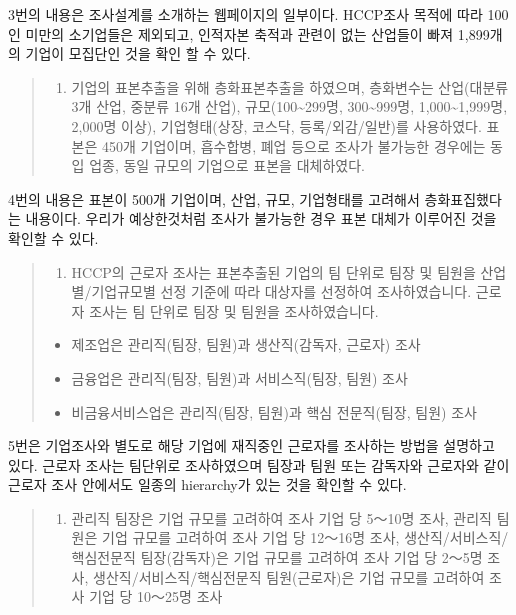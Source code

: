 \documentclass[
]{book}
\providecommand{\tightlist}{%
  \setlength{\itemsep}{0pt}\setlength{\parskip}{0pt}}
\theoremstyle{definition}
\theoremstyle{definition}
\theoremstyle{definition}
\theoremstyle{definition}
\theoremstyle{remark}
\begin{document}
3번의 내용은 조사설계를 소개하는 웹페이지의 일부이다. HCCP조사 목적에 따라 100인 미만의 소기업들은 제외되고, 인적자본 축적과 관련이 없는 산업들이 빠져 1,899개의 기업이 모집단인 것을 확인 할 수 있다.

\begin{quote}
\begin{enumerate}
\def\labelenumi{\arabic{enumi}.}
\setcounter{enumi}{3}
\tightlist
\item
  기업의 표본추출을 위해 층화표본추출을 하였으며, 층화변수는 산업(대분류 3개 산업, 중분류 16개 산업), 규모(100\textasciitilde299명, 300\textasciitilde999명, 1,000\textasciitilde1,999명, 2,000명 이상), 기업형태(상장, 코스닥, 등록/외감/일반)를 사용하였다. 표본은 450개 기업이며, 흡수합병, 폐업 등으로 조사가 불가능한 경우에는 동입 업종, 동일 규모의 기업으로 표본을 대체하였다.
\end{enumerate}
\end{quote}

4번의 내용은 표본이 500개 기업이며, 산업, 규모, 기업형태를 고려해서 층화표집했다는 내용이다. 우리가 예상한것처럼 조사가 불가능한 경우 표본 대체가 이루어진 것을 확인할 수 있다.

\begin{quote}
\begin{enumerate}
\def\labelenumi{\arabic{enumi}.}
\setcounter{enumi}{4}
\tightlist
\item
  HCCP의 근로자 조사는 표본추출된 기업의 팀 단위로 팀장 및 팀원을 산업별/기업규모별 선정 기준에 따라 대상자를 선정하여 조사하였습니다. 근로자 조사는 팀 단위로 팀장 및 팀원을 조사하였습니다.
\end{enumerate}

\begin{itemize}
\tightlist
\item
  제조업은 관리직(팀장, 팀원)과 생산직(감독자, 근로자) 조사
\item
  금융업은 관리직(팀장, 팀원)과 서비스직(팀장, 팀원) 조사
\item
  비금융서비스업은 관리직(팀장, 팀원)과 핵심 전문직(팀장, 팀원) 조사
\end{itemize}
\end{quote}

5번은 기업조사와 별도로 해당 기업에 재직중인 근로자를 조사하는 방법을 설명하고 있다. 근로자 조사는 팀단위로 조사하였으며 팀장과 팀원 또는 감독자와 근로자와 같이 근로자 조사 안에서도 일종의 hierarchy가 있는 것을 확인할 수 있다.

\begin{quote}
\begin{enumerate}
\def\labelenumi{\arabic{enumi}.}
\setcounter{enumi}{5}
\tightlist
\item
  관리직 팀장은 기업 규모를 고려하여 조사 기업 당 5～10명 조사, 관리직 팀원은 기업 규모를 고려하여 조사 기업 당 12～16명 조사, 생산직/서비스직/핵심전문직 팀장(감독자)은 기업 규모를 고려하여 조사 기업 당 2～5명 조사, 생산직/서비스직/핵심전문직 팀원(근로자)은 기업 규모를 고려하여 조사 기업 당 10～25명 조사
\end{enumerate}
\end{quote}
\end{document}
